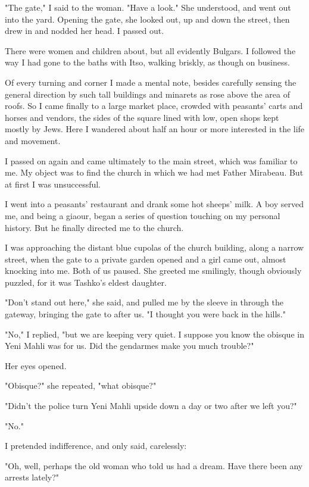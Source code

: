 \documentclass[a5paper,12pt]{book}
\begin{document}
"The gate," I said to the woman. "Have a look." She understood, and went out into the yard. Opening the gate, she looked out, up and down the street, then drew in and nodded her head. I passed out.

There were women and children about, but all evidently Bulgars. I followed the way I had gone to the baths with Itso, walking briskly, as though on business.

Of every turning and corner I made a mental note, besides carefully sensing the general direction by such tall buildings and minarets as rose above the area of roofs. So I came finally to a large market place, crowded with peasants’ carts and horses and vendors, the sides of the square lined with low, open shops kept mostly by Jews. Here I wandered about half an hour or more interested in the life and movement.

I passed on again and came ultimately to the main street, which was familiar to me. My object was to find the church in which we had met Father Mirabeau. But at first I was unsuccessful.

I went into a peasants' restaurant and drank some hot sheeps' milk. A boy served me, and being a giaour, began a series of question touching on my personal history. But he finally directed me to the church.

I was approaching the distant blue cupolas of the church building, along a narrow street, when the gate to a private garden opened and a girl came out, almost knocking into me. Both of us paused. She greeted me smilingly, though obviously puzzled, for it was Tashko’s eldest daughter.

"Don’t stand out here," she said, and pulled me by the sleeve in through the gateway, bringing the gate to after us. "I thought you were back in the hills."

"No," I replied, "but we are keeping very quiet. I suppose you know the obisque in Yeni Mahli was for us. Did the gendarmes make you much trouble?"

Her eyes opened.

"Obisque?" she repeated, "what obisque?"

"Didn’t the police turn Yeni Mahli upside down a day or two after we left you?"

"No."

I pretended indifference, and only said, carelessly:

"Oh, well, perhaps the old woman who told us had a dream. Have there been any arrests lately?"
\end{document}
